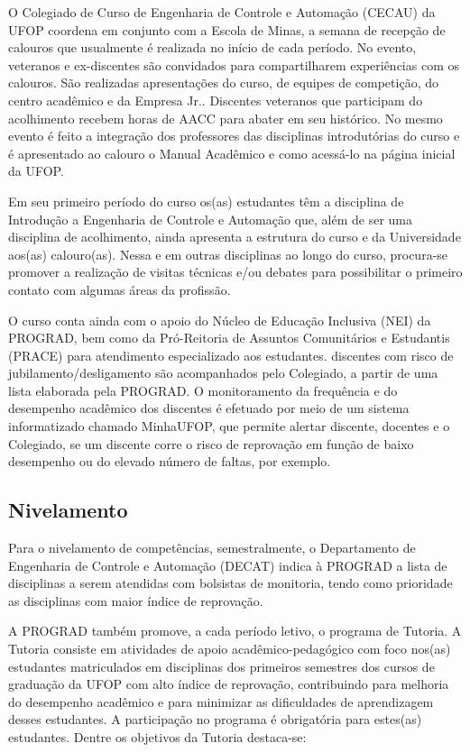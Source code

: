 \documentclass[
	12pt,				%
	openright,			%
	oneside,			%
	a4paper,			%
	english,			%
	brazil				%
	]{abntex2}
\begin{document}
O Colegiado de Curso de Engenharia de Controle e Automação (CECAU) da UFOP coordena em conjunto com a Escola de Minas, a semana de recepção de calouros que usualmente é realizada no início de cada período. No evento, veteranos e ex-discentes são convidados para compartilharem experiências com os calouros. São realizadas apresentações do curso, de equipes de competição, do centro acadêmico e da Empresa Jr.. Discentes veteranos que participam do acolhimento recebem horas de AACC para abater em seu histórico. No mesmo evento é feito a integração dos professores das disciplinas introdutórias do curso e é apresentado ao calouro o Manual Acadêmico e como acessá-lo na página inicial da UFOP.

Em seu primeiro período do curso os(as) estudantes têm a disciplina de Introdução a Engenharia de Controle e Automação que, além de ser uma disciplina de acolhimento, ainda apresenta a estrutura do curso e da Universidade aos(as) calouro(as). Nessa e em outras disciplinas ao longo do curso, procura-se promover a realização de visitas técnicas e/ou debates para possibilitar o primeiro contato com algumas áreas da profissão.

O curso conta ainda com o apoio do Núcleo de Educação Inclusiva (NEI) da PROGRAD, bem como da Pró-Reitoria de Assuntos Comunitários e Estudantis (PRACE) para atendimento especializado aos estudantes. discentes com risco de jubilamento/desligamento são acompanhados pelo Colegiado, a partir de uma lista elaborada pela PROGRAD. O monitoramento da frequência e do desempenho acadêmico dos discentes é efetuado por meio de um sistema informatizado chamado MinhaUFOP, que permite alertar discente, docentes e o Colegiado, se um discente corre o risco de reprovação em função de baixo desempenho ou do elevado número de faltas, por exemplo.

\subsection*{Nivelamento}

Para o nivelamento de competências, semestralmente, o Departamento de Engenharia de Controle e Automação (DECAT) indica à PROGRAD a lista de disciplinas a serem atendidas com bolsistas de monitoria, tendo como prioridade as disciplinas com maior índice de reprovação.

A PROGRAD também promove, a cada período letivo, o programa de Tutoria. A Tutoria consiste em atividades de apoio acadêmico-pedagógico com foco nos(as) estudantes matriculados em disciplinas dos primeiros semestres dos cursos de graduação da UFOP com alto índice de reprovação, contribuindo para melhoria do desempenho acadêmico e para minimizar as dificuldades de aprendizagem desses estudantes. A participação no programa é obrigatória para estes(as) estudantes. Dentre os objetivos da Tutoria destaca-se:
\end{document}
